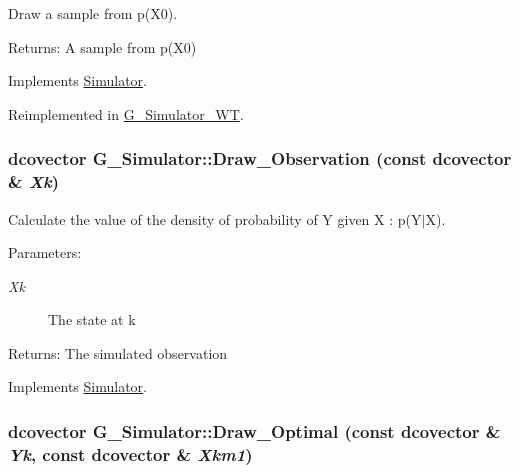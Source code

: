 Draw a sample from p(X0). 

\begin{Desc}
\item[Returns:]A sample from p(X0) \end{Desc}


Implements \hyperlink{class_simulator_29b9603eb2be9139972816329e8663dc}{Simulator}.

Reimplemented in \hyperlink{class_g___simulator___w_t_4dab061e25ad9b7b6c279d65ea3038d2}{G\_\-Simulator\_\-WT}.\hypertarget{class_g___simulator_b53bc573683cef16a5117dcc71a1f0a7}{
\subsubsection[{Draw\_\-Observation}]{\setlength{\rightskip}{0pt plus 5cm}dcovector G\_\-Simulator::Draw\_\-Observation (const dcovector \& {\em Xk})}}
\label{class_g___simulator_b53bc573683cef16a5117dcc71a1f0a7}


Calculate the value of the density of probability of Y given X : p(Y$|$X). 

\begin{Desc}
\item[Parameters:]
\begin{description}
\item[{\em Xk}]The state at k\end{description}
\end{Desc}
\begin{Desc}
\item[Returns:]The simulated observation \end{Desc}


Implements \hyperlink{class_simulator_2fb966c2c2a4c93bb6788e15563c9006}{Simulator}.\hypertarget{class_g___simulator_b6c78e1dfa62c8c684b860ea1918f045}{
\subsubsection[{Draw\_\-Optimal}]{\setlength{\rightskip}{0pt plus 5cm}dcovector G\_\-Simulator::Draw\_\-Optimal (const dcovector \& {\em Yk}, \/  const dcovector \& {\em Xkm1})}}
\label{class_g___simulator_b6c78e1dfa62c8c684b860ea1918f045}


